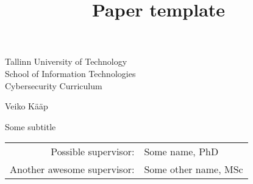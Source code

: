 \documentclass{src/style/main-style}
\title{Paper template}
\begin{document}
\thispagestyle{empty}
\begin{center}

  \large
  Tallinn University of Technology\\[2mm]
  School of Information Technologies\\
  Cybersecurity Curriculum\\[2mm]

  \vspace{25mm}

  \Large Veiko Kääp

  \vspace{4mm}

  \huge \articleName

  \vspace{20mm}

  \Large Some subtitle

\end{center}

\vspace{2mm}

\begin{flushright}
  {
    \setlength{\extrarowheight}{5pt}
    \begin{tabular}{r l}
      \sffamily Possible supervisor:        & \sffamily Some name, PhD       \\
      \sffamily Another awesome supervisor: & \sffamily Some other name, MSc
    \end{tabular}
  }
\end{flushright}

\vspace{10mm}

\vspace{2mm}



\vspace{2mm}


\vspace{8mm}
\end{document}
